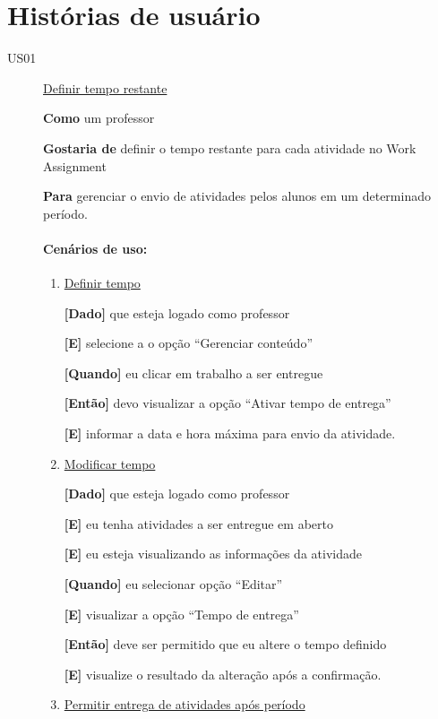 \chapter{Histórias de usuário}
\label{apen-historia-usuario}
\begin{description}

\item [US01\label{us01}] \underline{Definir tempo restante}

\textbf{Como} um professor

\textbf{Gostaria de} definir o tempo restante para cada atividade no Work Assignment

\textbf{Para} gerenciar o envio de atividades pelos alunos em um determinado período.

\subsubsection*{Cenários de uso:}

\begin{enumerate}
\item \underline{Definir tempo}

\textbf{[Dado]} que esteja logado como professor

\textbf{[E]} selecione a o opção ``Gerenciar conteúdo''

\textbf{[Quando]} eu clicar em trabalho a ser entregue

\textbf{[Então]} devo visualizar a opção ``Ativar tempo de entrega''

\textbf{[E]} informar a data e hora máxima para envio da atividade.

\item \underline{Modificar tempo}

\textbf{[Dado]} que esteja logado como professor

\textbf{[E]} eu tenha atividades a ser entregue em aberto

\textbf{[E]} eu esteja visualizando as informações da atividade

\textbf{[Quando]} eu selecionar opção ``Editar''

\textbf{[E]} visualizar a opção ``Tempo de entrega''

\textbf{[Então]} deve ser permitido que eu altere o tempo definido

\textbf{[E]} visualize o resultado da alteração após a confirmação.

\item \underline{Permitir entrega de atividades após período}


\end{enumerate}
\end{description}
